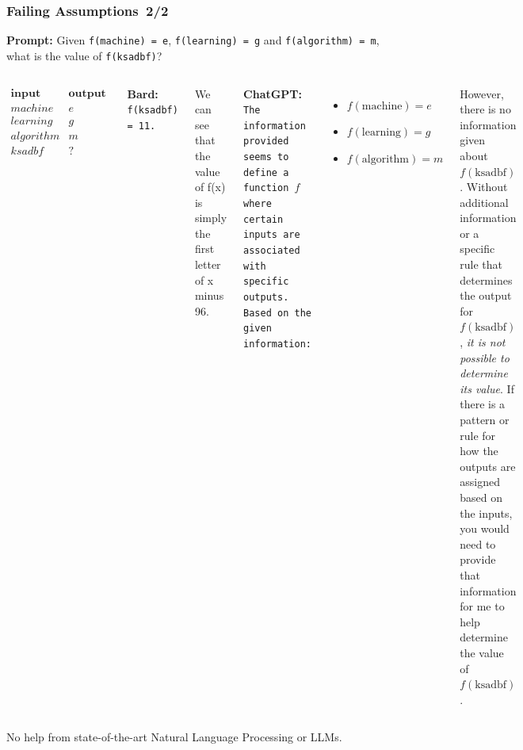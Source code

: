 \documentclass[bigger]{beamer}
\begin{document}
\begin{frame}
    \frametitle{Failing Assumptions\hfill~2/2}
    \footnotesize
    \begin{center}
        \textbf{Prompt:} Given \texttt{f(machine) = e}, \texttt{f(learning) = g} and \texttt{f(algorithm) = m}, what is the value of \texttt{f(ksadbf)}?
    \end{center}

    \vfill
    \begin{columns}[t]
        \scriptsize
        $$
            \begin{array}{r|l}
                \textbf{input} & \textbf{output} \\
                \hline
                machine        & e               \\
                learning       & g               \\
                algorithm      & m               \\
                ksadbf         & ?
            \end{array}
        $$

        \bigskip
        \textbf{Bard:} \tt f(ksadbf) = 11.

        We can see that the value of f(x) is simply the first letter of x minus 96.


        \textbf{ChatGPT:} \tt The information provided seems to define a function $f$ where certain inputs are associated with specific outputs. Based on the given information:
        \begin{itemize}
            \item $f(\text{machine}) = e$
            \item $f(\text{learning}) = g$
            \item $f(\text{algorithm}) = m$
        \end{itemize}
        However, there is no information given about \( f(\text{ksadbf}) \). Without additional information or a specific rule that determines the output for \( f(\text{ksadbf}) \), \emph{it is not possible to determine its value}.
        If there is a pattern or rule for how the outputs are assigned based on the inputs, you would need to provide that information for me to help determine the value of \( f(\text{ksadbf}) \).
    \end{columns}

    \vfill
    \begin{center}
        No help from state-of-the-art Natural Language Processing or LLMs.
    \end{center}
\end{frame}
\end{document}
